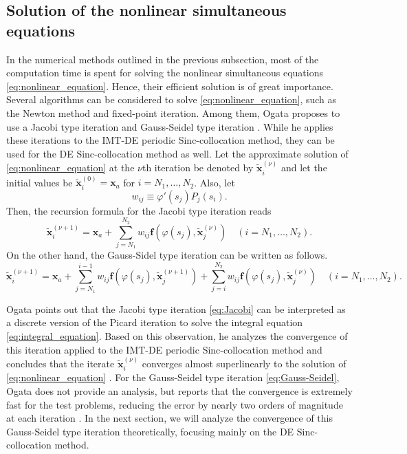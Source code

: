 \documentclass[pdflatex,sn-mathphys-num]{sn-jnl}%
\theoremstyle{thmstyleone}%
\theoremstyle{thmstyletwo}%
\theoremstyle{thmstylethree}%
\begin{document}
\subsection{Solution of the nonlinear simultaneous equations}
In the numerical methods outlined in the previous subsection, most of the computation time is spent for solving the nonlinear simultaneous equations \eqref{eq:nonlinear_equation}. Hence, their efficient solution is of great importance. Several algorithms can be considered to solve \eqref{eq:nonlinear_equation}, such as the Newton method and fixed-point iteration. Among them, Ogata proposes to use a Jacobi type iteration and Gauss-Seidel type iteration \cite{Ogata23}. While he applies these iterations to the IMT-DE periodic Sinc-collocation method, they can be used for the DE Sinc-collocation method as well. Let the approximate solution of \eqref{eq:nonlinear_equation} at the $\nu$th iteration be denoted by $\widetilde{\bm x}_i^{(\nu)}$ and let the initial values be $\widetilde{\bm x}_i^{(0)}={\bm x}_a$ for $i=N_1,\ldots,N_2$. Also, let
\begin{equation}
w_{ij}\equiv\varphi'(s_j)P_j(s_i).
\label{eq:wij}
\end{equation}
Then, the recursion formula for the Jacobi type iteration reads
\begin{equation}
\widetilde{\bm x}_i^{(\nu+1)} = {\bm x}_a + \sum_{j=N_1}^{N_2} w_{ij}{\bm f}(\varphi(s_j),\widetilde{\bm x}_j^{(\nu)}) \quad (i=N_1,\ldots,N_2).
\label{eq:Jacobi}
\end{equation}
On the other hand, the Gauss-Sidel type iteration can be written as follows.
\begin{equation}
\widetilde{\bm x}_i^{(\nu+1)} = {\bm x}_a + \sum_{j=N_1}^{i-1} w_{ij}{\bm f}(\varphi(s_j),\widetilde{\bm x}_j^{(\nu+1)}) + \sum_{j=i}^{N_2} w_{ij}{\bm f}(\varphi(s_j),\widetilde{\bm x}_j^{(\nu)}) \quad (i=N_1,\ldots,N_2). \label{eq:Gauss-Seidel}
\end{equation}

Ogata points out that the Jacobi type iteration \eqref{eq:Jacobi} can be interpreted as a discrete version of the Picard iteration to solve the integral equation \eqref{eq:integral_equation}. Based on this observation, he analyzes the convergence of this iteration applied to the IMT-DE periodic Sinc-collocation method and concludes that the iterate $\widetilde{\bm x}_i^{(\nu)}$ converges almost superlinearly to the solution of \eqref{eq:nonlinear_equation} \cite{Ogata23}. For the Gauss-Seidel type iteration \eqref{eq:Gauss-Seidel}, Ogata does not provide an analysis, but reports that the convergence is extremely fast for the test problems, reducing the error by nearly two orders of magnitude at each iteration \cite{Ogata23}. In the next section, we will analyze the convergence of this Gauss-Seidel type iteration theoretically, focusing mainly on the DE Sinc-collocation method.
\end{document}
